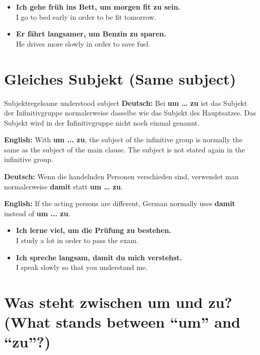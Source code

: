 \documentclass[a4paper,11pt]{article}
\newcommand{\GermanText}[1]{\textbf{Deutsch: }#1\par}
\newcommand{\EnglishText}[1]{{\small\color{SoftGray}\textbf{English: }#1\par}}
\newcommand{\ExampleItem}[2]{\item \textbf{#1}\\{\small\color{SoftGray}#2}}
\begin{document}
        \begin{exbox}
            \begin{itemize}
                \ExampleItem{Ich gehe früh ins Bett, um morgen fit zu sein.}{I go to bed early in order to be fit tomorrow.}
                \ExampleItem{Er fährt langsamer, um Benzin zu sparen.}{He drives more slowly in order to save fuel.}
            \end{itemize}
        \end{exbox}


    \section{Gleiches Subjekt \textnormal{(Same subject)}}

        \begin{grammarentry}{Subjektregel}{same understood subject}
            \GermanText{Bei \textbf{um \ldots{} zu} ist das Subjekt der Infinitivgruppe normalerweise dasselbe wie das Subjekt des Hauptsatzes. Das Subjekt wird in der Infinitivgruppe nicht noch einmal genannt.}
            \EnglishText{With \textbf{um ... zu}, the subject of the infinitive group is normally the same as the subject of the main clause. The subject is not stated again in the infinitive group.}

            \GermanText{Wenn die handelnden Personen verschieden sind, verwendet man normalerweise \textbf{damit} statt \textbf{um \ldots{} zu}.}
            \EnglishText{If the acting persons are different, German normally uses \textbf{damit} instead of \textbf{um ... zu}.}
        \end{grammarentry}

        \begin{exbox}
            \begin{itemize}
                \ExampleItem{Ich lerne viel, um die Prüfung zu bestehen.}{I study a lot in order to pass the exam.}
                \ExampleItem{Ich spreche langsam, damit du mich verstehst.}{I speak slowly so that you understand me.}
            \end{itemize}
        \end{exbox}


    \section{Was steht zwischen \glqq um\grqq{} und \glqq zu\grqq? \textnormal{(What stands between ``um'' and ``zu''?)}}
\end{document}
